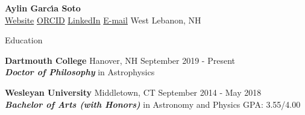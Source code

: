 \documentclass{resume} %
\begin{document}
\vspace{-1.0in}
{\LARGE\bf Aylin Garc\'\i a Soto} \\%
\vphantom{Danny Phantom}
{\href{https://aylingarciasoto.com}{Website}  \href {https://orcid.org/0000-0001-9828-3229}{ORCID}}     {\href{http://www.linkedin.com/in/aylin-garcia-soto-02b24a3a}{LinkedIn}}  {\href {mailto:aylin.garcia.soto.gr@dartmouth.edu}{E-mail}   West Lebanon, NH} \hfill

\begin{rSection}{Education}

{\bf Dartmouth College} \hfill Hanover, NH \hfill {September 2019 - Present} \\ 
{\textbf{\textit{Doctor of Philosophy}}} in Astrophysics

{\bf Wesleyan University} \hfill Middletown, CT \hfill {September 2014 - May 2018} \\ 
{\textbf{\textit{Bachelor of Arts (with Honors)}}} in Astronomy and Physics  \hfill {GPA: 3.55/4.00}
\end{rSection}
\end{document}
